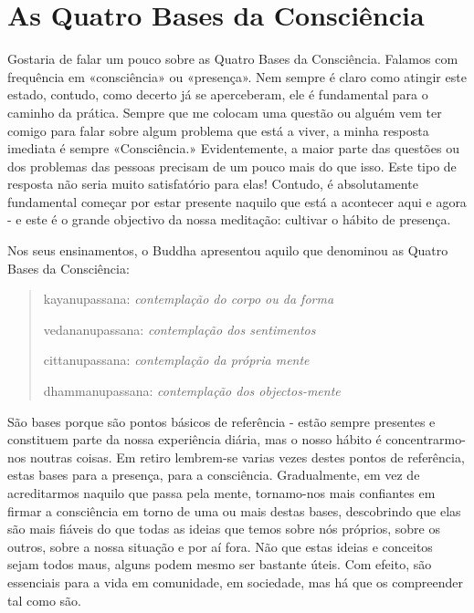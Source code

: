 \chapter{As Quatro Bases da Consciência}

Gostaria de falar um pouco sobre as Quatro Bases da Consciência. Falamos
com frequência em «consciência» ou «presença». Nem sempre é claro como
atingir este estado, contudo, como decerto já se aperceberam, ele é
fundamental para o caminho da prática. Sempre que me colocam uma questão
ou alguém vem ter comigo para falar sobre algum problema que está a
viver, a minha resposta imediata é sempre «Consciência.» Evidentemente,
a maior parte das questões ou dos problemas das pessoas precisam de um
pouco mais do que isso. Este tipo de resposta não seria muito
satisfatório para elas! Contudo, é absolutamente fundamental começar por
estar presente naquilo que está a acontecer aqui e agora - e este é o
grande objectivo da nossa meditação: cultivar o hábito de presença.

Nos seus ensinamentos, o Buddha apresentou aquilo que denominou as
Quatro Bases da Consciência:

\begin{quote}
  kayanupassana: \emph{contemplação do corpo ou da forma}

  vedananupassana: \emph{contemplação dos sentimentos}

  cittanupassana: \emph{contemplação da própria mente}

  dhammanupassana: \emph{contemplação dos objectos-mente}
\end{quote}

São bases porque são pontos básicos de referência - estão sempre
presentes e constituem parte da nossa experiência diária, mas o nosso
hábito é concentrarmo-nos noutras coisas. Em retiro lembrem-se varias
vezes destes pontos de referência, estas bases para a presença, para a
consciência. Gradualmente, em vez de acreditarmos naquilo que passa pela
mente, tornamo-nos mais confiantes em firmar a consciência em torno de
uma ou mais destas bases, descobrindo que elas são mais fiáveis do que
todas as ideias que temos sobre nós próprios, sobre os outros, sobre a
nossa situação e por aí fora. Não que estas ideias e conceitos sejam
todos maus, alguns podem mesmo ser bastante úteis. Com efeito, são
essenciais para a vida em comunidade, em sociedade, mas há que os
compreender tal como são.

